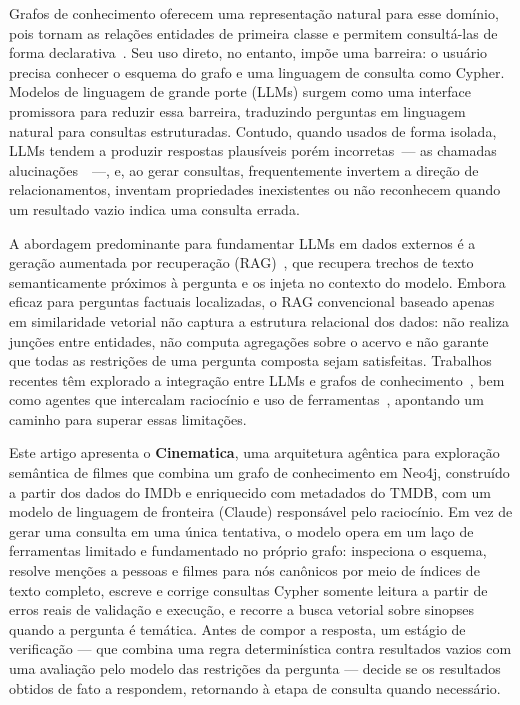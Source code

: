 \documentclass[12pt]{article}
\begin{document}
    Grafos de conhecimento oferecem uma representação natural para esse domínio, pois tornam as relações entidades de primeira classe e permitem consultá-las de forma declarativa~\cite{hogan2021knowledge}. Seu uso direto, no entanto, impõe uma barreira: o usuário precisa conhecer o esquema do grafo e uma linguagem de consulta como Cypher. Modelos de linguagem de grande porte (LLMs) surgem como uma interface promissora para reduzir essa barreira, traduzindo perguntas em linguagem natural para consultas estruturadas. Contudo, quando usados de forma isolada, LLMs tendem a produzir respostas plausíveis porém incorretas~--- as chamadas alucinações~\cite{ji2023hallucination}~---, e, ao gerar consultas, frequentemente invertem a direção de relacionamentos, inventam propriedades inexistentes ou não reconhecem quando um resultado vazio indica uma consulta errada.

    A abordagem predominante para fundamentar LLMs em dados externos é a geração aumentada por recuperação (RAG)~\cite{lewis2020rag}, que recupera trechos de texto semanticamente próximos à pergunta e os injeta no contexto do modelo. Embora eficaz para perguntas factuais localizadas, o RAG convencional baseado apenas em similaridade vetorial não captura a estrutura relacional dos dados: não realiza junções entre entidades, não computa agregações sobre o acervo e não garante que todas as restrições de uma pergunta composta sejam satisfeitas. Trabalhos recentes têm explorado a integração entre LLMs e grafos de conhecimento~\cite{pan2024unifying, edge2024graphrag}, bem como agentes que intercalam raciocínio e uso de ferramentas~\cite{yao2023react, schick2023toolformer}, apontando um caminho para superar essas limitações.

    Este artigo apresenta o \textbf{Cinematica}, uma arquitetura agêntica para exploração semântica de filmes que combina um grafo de conhecimento em Neo4j, construído a partir dos dados do IMDb e enriquecido com metadados do TMDB, com um modelo de linguagem de fronteira (Claude) responsável pelo raciocínio. Em vez de gerar uma consulta em uma única tentativa, o modelo opera em um laço de ferramentas limitado e fundamentado no próprio grafo: inspeciona o esquema, resolve menções a pessoas e filmes para nós canônicos por meio de índices de texto completo, escreve e corrige consultas Cypher somente leitura a partir de erros reais de validação e execução, e recorre a busca vetorial sobre sinopses quando a pergunta é temática. Antes de compor a resposta, um estágio de verificação --- que combina uma regra determinística contra resultados vazios com uma avaliação pelo modelo das restrições da pergunta --- decide se os resultados obtidos de fato a respondem, retornando à etapa de consulta quando necessário.
\end{document}

